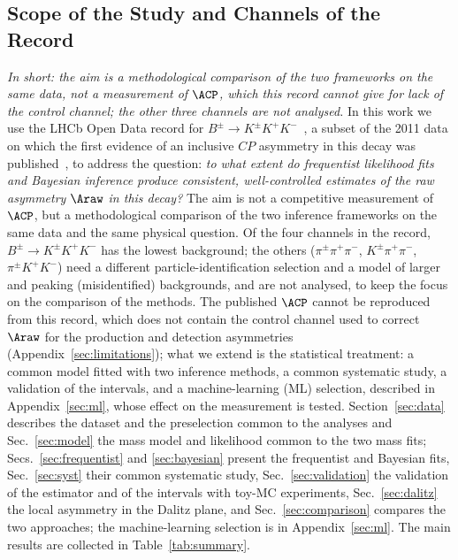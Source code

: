 \subsection{Scope of the Study and Channels of the Record}
\emph{In short: the aim is a methodological comparison of the two frameworks on the same data, not a measurement of $\ACP$, which this record cannot give for lack of the control channel; the other three channels are not analysed.}
In this work we use the LHCb Open Data record for $B^{\pm}\to K^{\pm}K^{+}K^{-}$~\cite{opendata_record,opendata_notebook}, a subset of the 2011 data on which the first evidence of an inclusive $CP$ asymmetry in this decay was published~\cite{lhcb_cpv_2013}, to address the question: \emph{to what extent do frequentist likelihood fits and Bayesian inference produce consistent, well-controlled estimates of the raw asymmetry $\Araw$ in this decay?} The aim is not a competitive measurement of $\ACP$, but a methodological comparison of the two inference frameworks on the same data and the same physical question. Of the four channels in the record, $B^\pm\to K^\pm K^+K^-$ has the lowest background; the others ($\pi^\pm\pi^+\pi^-$, $K^\pm\pi^+\pi^-$, $\pi^\pm K^+K^-$) need a different particle-identification selection and a model of larger and peaking (misidentified) backgrounds, and are not analysed, to keep the focus on the comparison of the methods. The published $\ACP$ cannot be reproduced from this record, which does not contain the control channel used to correct $\Araw$ for the production and detection asymmetries (Appendix~\ref{sec:limitations}); what we extend is the statistical treatment: a common model fitted with two inference methods, a common systematic study, a validation of the intervals, and a machine-learning (ML) selection, described in Appendix~\ref{sec:ml}, whose effect on the measurement is tested. Section~\ref{sec:data} describes the dataset and the preselection common to the analyses and Sec.~\ref{sec:model} the mass model and likelihood common to the two mass fits; Secs.~\ref{sec:frequentist} and \ref{sec:bayesian} present the frequentist and Bayesian fits, Sec.~\ref{sec:syst} their common systematic study, Sec.~\ref{sec:validation} the validation of the estimator and of the intervals with toy-MC experiments, Sec.~\ref{sec:dalitz} the local asymmetry in the Dalitz plane, and Sec.~\ref{sec:comparison} compares the two approaches; the machine-learning selection is in Appendix~\ref{sec:ml}. The main results are collected in Table~\ref{tab:summary}.

